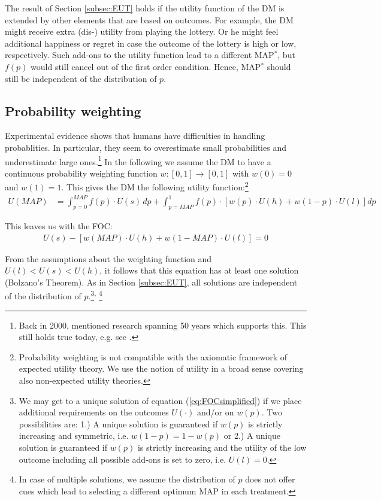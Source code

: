 The result of Section \ref{subsec:EUT} holds if the utility function of the DM is extended by other elements that are based on outcomes.
For example, the DM might receive extra \mbox{(dis-)} utility from playing the lottery.
Or he might feel additional happiness or regret in case the outcome of the lottery is high or low, respectively.
Such add-ons to the utility function lead to a different MAP$^*$, but $f(p)$ would still cancel out of the first order condition.
Hence, MAP$^*$ should still be independent of the distribution of $p$.  


\subsection{Probability weighting}

Experimental evidence shows that humans have difficulties in handling probablities.
In particular, they seem to overestimate small probabilities and underestimate large ones.\footnote{
Back in 2000, \citet[p.~348--349]{Starmer2000} mentioned research spanning 50 years which supports this.
This still holds true today, e.g. see \citet[Figure 4 on p.~276]{Li2020a}.  
} 
In the following we assume the DM to have a continuous probability weighting function $w: [0,1] \rightarrow [0,1]$ with $w(0) = 0$ and $w(1) = 1$.
This gives the DM the following utility function:\footnote{
Probability weighting is not compatible with the axiomatic framework of expected utility theory.
We use the notion of utility in a broad sense covering also non-expected utility theories.
}
\begin{align}
	U(\textit{MAP}) &= \int_{p=0}^{\textit{MAP}} f(p) \cdot U(s) \, dp %
	+ \int_{p=\textit{MAP}}^1 f(p) \cdot \left[w(p) \cdot U(h) + w(1-p) \cdot U(l) \right] dp
\end{align}

This leaves us with the FOC:
\begin{align}
	\label{eq:FOCsimplified}
	U(s) - \left[w(\textit{MAP}) \cdot U(h) + w(1-\textit{MAP}) \cdot U(l) \right] = 0 
\end{align}

From the assumptions about the weighting function and $U(l)<U(s)<U(h)$, it follows that this equation has at least one solution (Bolzano's Theorem).
As in Section \ref{subsec:EUT}, all solutions are independent of the distribution of $p$.\footnote{
We may get to a unique solution of equation (\ref{eq:FOCsimplified}) if we place additional requirements on the outcomes $U(\cdot)$ and/or on $w(p)$.
Two possibilities are:
1.) A unique solution is guaranteed if $w(p)$ is strictly increasing and symmetric, i.e. $w(1-p) = 1-w(p)$ or
2.) A unique solution is guaranteed if $w(p)$ is strictly increasing and the utility of the low outcome including all possible add-ons is set to zero, i.e. $U(l) = 0$.
}\textsuperscript{,} 
\footnote{
In case of multiple solutions, we assume the distribution of $p$ does not offer cues which lead to selecting a different optimum MAP in each treatment.
}
	

